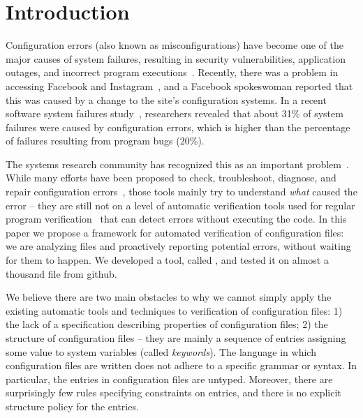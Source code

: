 \section{Introduction}
\label{sec-intro}

Configuration errors (also known as misconfigurations) have become
one of the major causes of system failures, resulting in security vulnerabilities,
application outages, and incorrect program executions~\cite{xu15systems, xu13do, xu15hey}. Recently, there was a problem in accessing  
Facebook and Instagram~\cite{mashableNews}, 
and a Facebook spokeswoman reported that 
this was caused by a change to the site's configuration systems.
In a recent software system failures study~\cite{yin11anempirical},
researchers revealed that about 31\% of system failures were caused by 
configuration errors, which is higher than the percentage of
failures resulting from program bugs (20\%).

The systems research community has recognized this as an important
problem~\cite{xu16early}. While many efforts have been proposed to check, troubleshoot, diagnose, and repair configuration 
errors~\cite{attariyan10automating,
su07autobash, whitaker04configuration},
those tools mainly try to understand {\emph{what}} caused the 
error -- they are still not on a level of
automatic verification tools used for regular program 
verification~\cite{Leino10Dafny, PiskacWZ14, BobotFMP15} that can
detect errors without executing the code. In this paper we propose
a framework for automated verification of configuration files: we are analyzing 
files and proactively reporting potential errors, without waiting for them to happen. We developed a tool, called \app, and tested it on 
almost a thousand file from github.

We believe there are two main obstacles 
to why we cannot simply apply  the existing automatic 
tools and techniques to verification of configuration files:
1) the lack
of a specification describing properties of configuration files;
2) the structure of configuration files -- they
are mainly a sequence of entries assigning some value to system
variables (called {\emph {keywords}}). 
The language in which configuration files are written does 
not adhere to a specific grammar or syntax. In particular, the
entries in configuration files are untyped. Moreover, there are surprisingly few rules specifying constraints on entries, and there
is no explicit structure policy for the entries.

